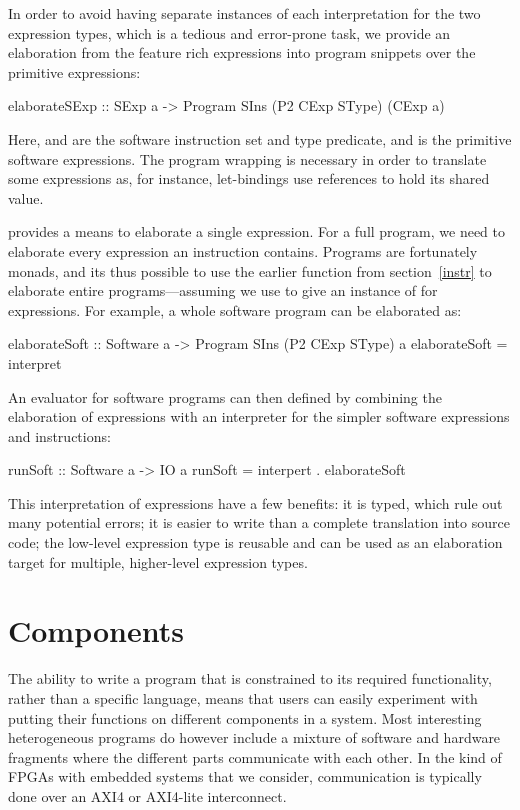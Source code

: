 \documentclass[../paper.tex]{subfiles}
\begin{document}
In order to avoid having separate instances of each interpretation for the two expression types, which is a tedious and error-prone task, we provide an elaboration from the feature rich expressions into program snippets over the primitive expressions:

\begin{code}
elaborateSExp :: SExp a -> Program SIns (P2 CExp SType) (CExp a)
\end{code}

\noindent Here,  and  are the software instruction set and type predicate, and  is the primitive software expressions. The program wrapping is necessary in order to translate some expressions as, for instance, let-bindings use references to hold its shared value.

 provides a means to elaborate a single expression. For a full program, we need to elaborate every expression an instruction contains. Programs are fortunately monads, and its thus possible to use the earlier  function from section~\ref{instr} to elaborate entire programs---assuming we use  to give an instance of  for expressions. For example, a whole software program can be elaborated as:

\begin{code}
elaborateSoft :: Software a -> Program SIns (P2 CExp SType) a
elaborateSoft = interpret
\end{code}

An evaluator for software programs can then defined by combining the elaboration of expressions with an interpreter for the simpler software expressions and instructions:

\begin{code}
runSoft :: Software a -> IO a
runSoft = interpert . elaborateSoft
\end{code}

This interpretation of expressions have a few benefits: it is typed, which rule out many potential errors; it is easier to write than a complete translation into source code; the low-level expression type is reusable and can be used as an elaboration target for multiple, higher-level expression types.

\section{Components}

The ability to write a program that is constrained to its required functionality, rather than a specific language, means that users can easily experiment with putting their functions on different components in a system. Most interesting heterogeneous programs do however include a mixture of software and hardware fragments where the different parts communicate with each other. In the kind of FPGAs with embedded systems that we consider, communication is typically done over an AXI4 or AXI4-lite interconnect. 
\end{document}
